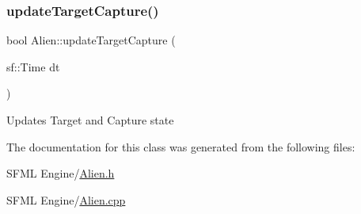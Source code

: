\subsubsection{\texorpdfstring{update\+Target\+Capture()}{updateTargetCapture()}}
{\footnotesize\ttfamily bool Alien\+::update\+Target\+Capture (\begin{DoxyParamCaption}\item[{sf\+::\+Time}]{dt }\end{DoxyParamCaption})}

Updates Target and Capture state 

The documentation for this class was generated from the following files\+:\begin{DoxyCompactItemize}
\item 
S\+F\+M\+L Engine/\hyperlink{_alien_8h}{Alien.\+h}\item 
S\+F\+M\+L Engine/\hyperlink{_alien_8cpp}{Alien.\+cpp}\end{DoxyCompactItemize}
